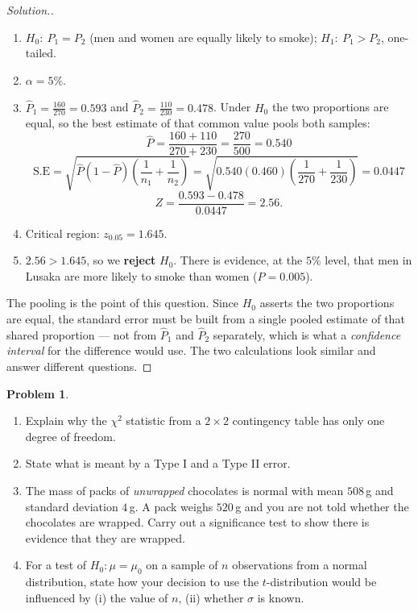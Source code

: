 \documentclass[11pt,a4paper]{article}
\theoremstyle{definition}
\newtheorem{problemx}{Problem}[section]
\newenvironment{problem}{\begin{problemx}}{\end{problemx}}
\newenvironment{solution}
  {\renewcommand{\qedsymbol}{}\begin{proof}[\textit{Solution}.]}
  {\end{proof}}
\begin{document}
\begin{solution}
\begin{enumerate}
\item $H_0:\ P_1=P_2$ (men and women are equally likely to smoke); $H_1:\ P_1>P_2$,
one-tailed.
\item $\alpha=5\%$.
\item $\hat{P}_1=\frac{160}{270}=0.593$ and $\hat{P}_2=\frac{110}{230}=0.478$. Under $H_0$
the two proportions are equal, so the best estimate of that common value pools both samples:
\[\hat{P}=\frac{160+110}{270+230}=\frac{270}{500}=0.540\]
\[\text{S.E}=\sqrt{\hat{P}(1-\hat{P})\left(\frac{1}{n_1}+\frac{1}{n_2}\right)}
=\sqrt{0.540(0.460)\left(\frac{1}{270}+\frac{1}{230}\right)}=0.0447\]
\[Z=\frac{0.593-0.478}{0.0447}=2.56.\]
\item Critical region: $z_{0.05}=1.645$.
\item $2.56>1.645$, so we \textbf{reject} $H_0$. There is evidence, at the $5\%$ level, that
men in Lusaka are more likely to smoke than women ($P=0.005$).
\end{enumerate}

The pooling is the point of this question. Since $H_0$ asserts the two proportions are
equal, the standard error must be built from a single pooled estimate of that shared
proportion --- not from $\hat{P}_1$ and $\hat{P}_2$ separately, which is what a
\emph{confidence interval} for the difference would use. The two calculations look similar
and answer different questions.
\end{solution}

\begin{problem}
\begin{enumerate}
\item[(a).] Explain why the $\chi^2$ statistic from a $2\times 2$ contingency table has only
one degree of freedom.
\item[(b).] State what is meant by a Type I and a Type II error.
\item[(c).] The mass of packs of \emph{unwrapped} chocolates is normal with mean $508$\,g and
standard deviation $4$\,g. A pack weighs $520$\,g and you are not told whether the chocolates
are wrapped. Carry out a significance test to show there is evidence that they are wrapped.
\item[(d).] For a test of $H_0:\mu=\mu_0$ on a sample of $n$ observations from a normal
distribution, state how your decision to use the $t$-distribution would be influenced by
(i) the value of $n$, (ii) whether $\sigma$ is known.
\end{enumerate}
\end{problem}
\end{document}
